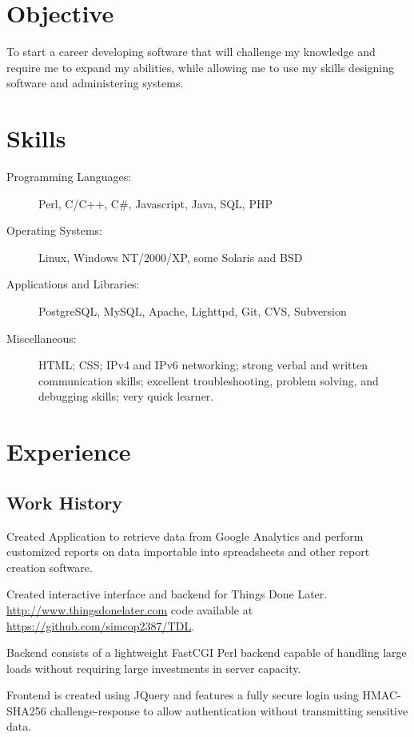 \documentclass[table,tmargin=1in,bmargin=1in,letterpaper]{resume}
\author{Ryan Voots}
\begin{document}
\maketitle
\vspace{0.1in}

\section{Objective}
To start a career developing software that will challenge my knowledge and require me to expand my abilities, while allowing me to use my skills designing software and administering systems.

\section{Skills}
\begin{description}
\item[Programming Languages:]
Perl, C/C++, C\#, Javascript, Java, SQL, PHP
\item[Operating Systems:]
Linux, Windows NT/2000/XP, some Solaris and BSD
\item[Applications and Libraries:]
PostgreSQL, MySQL, Apache, Lighttpd, Git, CVS, Subversion
\item[Miscellaneous:]
HTML; CSS; IPv4 and IPv6 networking; strong verbal and written communication skills; excellent troubleshooting, problem solving, and debugging skills; very quick learner.
\end{description}

\section{Experience}

\subsection{Work History}

\begin{compactitem}
\item Created Application to retrieve data from Google Analytics and perform customized reports on data importable into spreadsheets and other report creation software.
\end{compactitem}

\begin{compactitem}
\item Created interactive interface and backend for Things Done Later.  \url{http://www.thingsdonelater.com} code available at \url{https://github.com/simcop2387/TDL}.
\item Backend consists of a lightweight FastCGI Perl backend capable of handling large loads without requiring large investments in server capacity.
\item Frontend is created using JQuery and features a fully secure login using HMAC-SHA256 challenge-response to allow authentication without transmitting sensitive data.
\end{compactitem}
\end{document}
